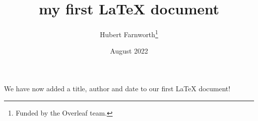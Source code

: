 \documentclass[12pt, letterpaper]{article}
\title{my first LaTeX document}
\author{Hubert Farnworth\thanks{Funded by the Overleaf team.}}
\date{August 2022}
\begin{document}
\maketitle
We have now added a title, author and date to our first \LaTeX{} document!
\end{document}
